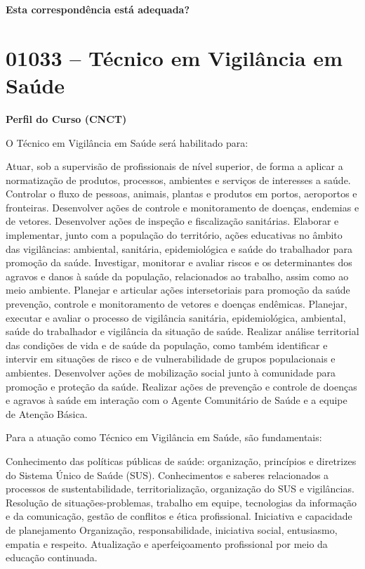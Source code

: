 \documentclass[
]{article}
\begin{document}
\begin{Form}
\textbf{Esta correspondência está adequada?} \\ 
\end{Form}

\newpage
\section{ 01033 -- Técnico em Vigilância em Saúde }

\textbf{Perfil do Curso (CNCT)}

O Técnico em Vigilância em Saúde será habilitado para:

Atuar, sob a supervisão de profissionais de nível superior, de forma a
aplicar a normatização de produtos, processos, ambientes e serviços de
interesses a saúde. Controlar o fluxo de pessoas, animais, plantas e
produtos em portos, aeroportos e fronteiras. Desenvolver ações de
controle e monitoramento de doenças, endemias e de vetores. Desenvolver
ações de inspeção e fiscalização sanitárias. Elaborar e implementar,
junto com a população do território, ações educativas no âmbito das
vigilâncias: ambiental, sanitária, epidemiológica e saúde do trabalhador
para promoção da saúde. Investigar, monitorar e avaliar riscos e os
determinantes dos agravos e danos à saúde da população, relacionados ao
trabalho, assim como ao meio ambiente. Planejar e articular ações
intersetoriais para promoção da saúde prevenção, controle e
monitoramento de vetores e doenças endêmicas. Planejar, executar e
avaliar o processo de vigilância sanitária, epidemiológica, ambiental,
saúde do trabalhador e vigilância da situação de saúde. Realizar análise
territorial das condições de vida e de saúde da população, como também
identificar e intervir em situações de risco e de vulnerabilidade de
grupos populacionais e ambientes. Desenvolver ações de mobilização
social junto à comunidade para promoção e proteção da saúde. Realizar
ações de prevenção e controle de doenças e agravos à saúde em interação
com o Agente Comunitário de Saúde e a equipe de Atenção Básica.

Para a atuação como Técnico em Vigilância em Saúde, são fundamentais:

Conhecimento das políticas públicas de saúde: organização, princípios e
diretrizes do Sistema Único de Saúde (SUS). Conhecimentos e saberes
relacionados a processos de sustentabilidade, territorialização,
organização do SUS e vigilâncias. Resolução de situações-problemas,
trabalho em equipe, tecnologias da informação e da comunicação, gestão
de conflitos e ética profissional. Iniciativa e capacidade de
planejamento Organização, responsabilidade, iniciativa social,
entusiasmo, empatia e respeito. Atualização e aperfeiçoamento
profissional por meio da educação continuada.
\end{document}
